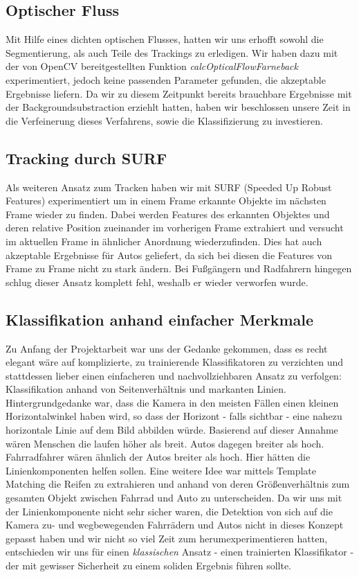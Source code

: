 \documentclass[conference]{IEEEtran}
\begin{document}
\subsection{Optischer Fluss}

Mit Hilfe eines dichten optischen Flusses, hatten wir uns erhofft sowohl die Segmentierung, als auch Teile des Trackings zu erledigen. Wir haben dazu mit der von OpenCV bereitgestellten Funktion \textit{calcOpticalFlowFarneback} experimentiert, jedoch keine passenden Parameter gefunden, die akzeptable Ergebnisse liefern. Da wir zu diesem Zeitpunkt bereits brauchbare Ergebnisse mit der Backgroundsubstraction erziehlt hatten, haben wir beschlossen unsere Zeit in die Verfeinerung dieses Verfahrens, sowie die Klassifizierung zu investieren. 

\subsection{Tracking durch SURF}

Als weiteren Ansatz zum Tracken haben wir mit SURF (Speeded Up Robust Features) experimentiert um in einem Frame erkannte Objekte im nächsten Frame wieder zu finden. Dabei werden Features des erkannten Objektes und deren relative Position zueinander im vorherigen Frame extrahiert und versucht im aktuellen Frame in ähnlicher Anordnung wiederzufinden. Dies hat auch akzeptable Ergebnisse für Autos geliefert, da sich bei diesen die Features von Frame zu Frame nicht zu stark ändern. Bei Fußgängern und Radfahrern hingegen schlug dieser Ansatz komplett fehl, weshalb er wieder verworfen wurde.

\subsection{Klassifikation anhand einfacher Merkmale}

Zu Anfang der Projektarbeit war uns der Gedanke gekommen, dass es recht elegant wäre auf komplizierte, zu trainierende Klassifikatoren zu verzichten und stattdessen lieber einen einfacheren und nachvollziehbaren Ansatz zu verfolgen: Klassifikation anhand von Seitenverhältnis und markanten Linien. Hintergrundgedanke war, dass die Kamera in den meisten Fällen einen kleinen Horizontalwinkel haben wird, so dass der Horizont - falls sichtbar - eine nahezu horizontale Linie auf dem Bild abbilden würde. Basierend auf dieser Annahme wären Menschen die laufen höher als breit. Autos dagegen breiter als hoch. Fahrradfahrer wären ähnlich der Autos breiter als hoch. Hier hätten die Linienkomponenten helfen sollen. Eine weitere Idee war mittels Template Matching die Reifen zu extrahieren und anhand von deren Größenverhältnis zum gesamten Objekt zwischen Fahrrad und Auto zu unterscheiden.
Da wir uns mit der Linienkomponente nicht sehr sicher waren, die Detektion von sich auf die Kamera zu- und wegbewegenden Fahrrädern und Autos nicht in dieses Konzept gepasst haben und wir nicht so viel Zeit zum herumexperimentieren hatten, entschieden wir uns für einen \textit{klassischen} Ansatz - einen trainierten Klassifikator - der mit gewisser Sicherheit zu einem soliden Ergebnis führen sollte.
\end{document}
